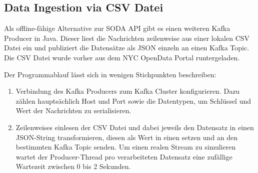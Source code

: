 \subsection{Data Ingestion via CSV Datei}
Als offline-fähige Alternative zur \ac{SODA} API gibt es einen weiteren Kafka Producer in Java. Dieser liest die Nachrichten zeilenweise aus einer lokalen \ac{CSV} Datei ein und publiziert die Datensätze als \ac{JSON} einzeln an einen Kafka Topic. Die \ac{CSV} Datei wurde vorher aus dem NYC OpenData Portal runtergeladen.

Der Programmablauf lässt sich in wenigen Stichpunkten beschreiben:
\begin{enumerate}
	\item Verbindung des Kafka Producers zum Kafka Cluster konfigurieren. Dazu zählen hauptsächlich Host und Port sowie die Datentypen, um Schlüssel und Wert der Nachrichten zu serialisieren.  
	\item Zeilenweises einlesen der \ac{CSV} Datei und dabei jeweils den Datensatz in einen \ac{JSON}-String transformieren, diesen  als Wert in einen  setzen und an den bestimmten Kafka Topic senden. Um einen realen Stream zu simulieren wartet der Producer-Thread pro verarbeiteten Datensatz eine zufällige Wartezeit zwischen 0 bis 2 Sekunden.
\end{enumerate}




